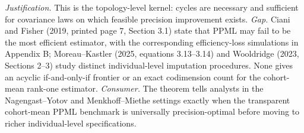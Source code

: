 \documentclass{article}
\begin{document}
\par\smallskip\noindent \textit{Justification.} This is the topology-level kernel: cycles are necessary and sufficient for covariance laws on which feasible precision improvement exists. \textit{Gap.} Ciani and Fisher (2019, printed page 7, Section 3.1) state that PPML may fail to be the most efficient estimator, with the corresponding efficiency-loss simulations in Appendix B; Moreau--Kastler (2025, equations 3.13--3.14) and Wooldridge (2023, Sections 2--3) study distinct individual-level imputation procedures. None gives an acyclic if-and-only-if frontier or an exact codimension count for the cohort-mean rank-one estimator. \textit{Consumer.} The theorem tells analysts in the Nagengast--Yotov and Menkhoff--Miethe settings exactly when the transparent cohort-mean PPML benchmark is universally precision-optimal before moving to richer individual-level specifications.
\end{document}

